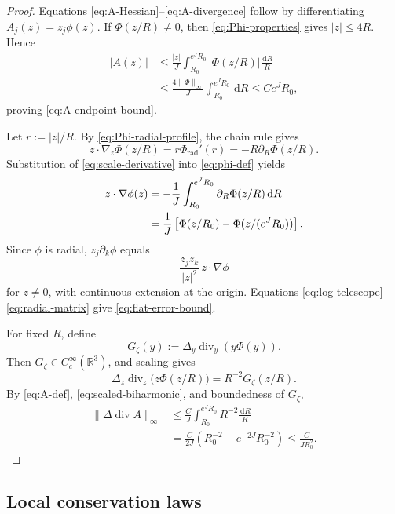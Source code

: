 \documentclass{interact}
\numberwithin{equation}{section}
\theoremstyle{plain}
\theoremstyle{definition}
\theoremstyle{remark}
\newcommand{\R}{\mathbb R}
\newcommand{\dd}{\,\mathrm d}
\begin{document}
\begin{proof}
Equations \eqref{eq:A-Hessian}--\eqref{eq:A-divergence} follow by differentiating $A_j(z)=z_j\phi(z)$. If $\Phi(z/R)\ne0$, then \eqref{eq:Phi-properties} gives $|z|\le4R$. Hence
\begin{align*}
 |A(z)|
 &\le \frac{|z|}{J}\int_{R_0}^{e^JR_0}
 |\Phi(z/R)|\frac{\dd R}{R}\\
 &\le \frac{4\|\Phi\|_\infty}{J}\int_{R_0}^{e^JR_0}\dd R
 \le Ce^JR_0,
\end{align*}
proving \eqref{eq:A-endpoint-bound}.

Let $r:=|z|/R$. By \eqref{eq:Phi-radial-profile}, the chain rule gives
\begin{equation}\label{eq:scale-derivative}
 z\cdot\nabla_z\Phi(z/R)
 =r\Phi_{\mathrm{rad}}'(r)
 =-R\partial_R\Phi(z/R).
\end{equation}
Substitution of \eqref{eq:scale-derivative} into \eqref{eq:phi-def} yields
\begin{align}
 z\cdot\nabla\phi(z)
 &=-\frac1J\int_{R_0}^{e^JR_0}\partial_R\Phi(z/R)\dd R\notag\\
 &=\frac1J\left[\Phi(z/R_0)-\Phi(z/(e^JR_0))\right].
 \label{eq:log-telescope}
\end{align}
Since $\phi$ is radial, $z_j\partial_k\phi$ equals
\begin{equation}\label{eq:radial-matrix}
 \frac{z_jz_k}{|z|^2}\,z\cdot\nabla\phi
\end{equation}
for $z\ne0$, with continuous extension at the origin. Equations \eqref{eq:log-telescope}--\eqref{eq:radial-matrix} give \eqref{eq:flat-error-bound}.

For fixed $R$, define
\[
 G_\zeta(y):=\Delta_y\operatorname{div}_y(y\Phi(y)).
\]
Then $G_\zeta\in C_c^\infty(\R^3)$, and scaling gives
\begin{equation}\label{eq:scaled-biharmonic}
 \Delta_z\operatorname{div}_z\bigl(z\Phi(z/R)\bigr)
 =R^{-2}G_\zeta(z/R).
\end{equation}
By \eqref{eq:A-def}, \eqref{eq:scaled-biharmonic}, and boundedness of $G_\zeta$,
\begin{align*}
 \|\Delta\operatorname{div}A\|_\infty
 &\le\frac{C}{J}\int_{R_0}^{e^JR_0}R^{-2}\frac{\dd R}{R}\\
 &=\frac{C}{2J}\left(R_0^{-2}-e^{-2J}R_0^{-2}\right)
 \le\frac{C}{JR_0^2}.
\end{align*}
\end{proof}

\subsection{Local conservation laws}
\end{document}
